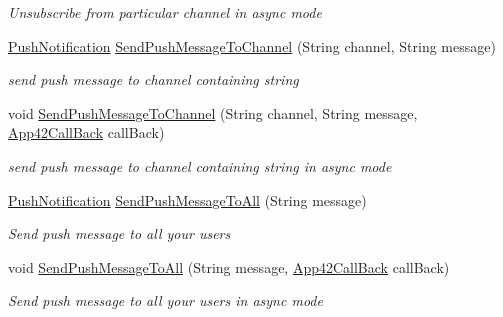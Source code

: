 \begin{DoxyCompactItemize}
\begin{DoxyCompactList}\small\item\em Unsubscribe from particular channel in async mode \end{DoxyCompactList}\item 
\hyperlink{classcom_1_1shephertz_1_1app42_1_1paas_1_1sdk_1_1csharp_1_1push_notification_1_1_push_notification}{Push\+Notification} \hyperlink{classcom_1_1shephertz_1_1app42_1_1paas_1_1sdk_1_1csharp_1_1push_notification_1_1_push_notification_service_af5676989bbb59ea1db8d457072159b58}{Send\+Push\+Message\+To\+Channel} (String channel, String message)
\begin{DoxyCompactList}\small\item\em send push message to channel containing string \end{DoxyCompactList}\item 
void \hyperlink{classcom_1_1shephertz_1_1app42_1_1paas_1_1sdk_1_1csharp_1_1push_notification_1_1_push_notification_service_a28ea0a4d4d3450dfecda9f8a8ef63fd1}{Send\+Push\+Message\+To\+Channel} (String channel, String message, \hyperlink{interfacecom_1_1shephertz_1_1app42_1_1paas_1_1sdk_1_1csharp_1_1_app42_call_back}{App42\+Call\+Back} call\+Back)
\begin{DoxyCompactList}\small\item\em send push message to channel containing string in async mode \end{DoxyCompactList}\item 
\hyperlink{classcom_1_1shephertz_1_1app42_1_1paas_1_1sdk_1_1csharp_1_1push_notification_1_1_push_notification}{Push\+Notification} \hyperlink{classcom_1_1shephertz_1_1app42_1_1paas_1_1sdk_1_1csharp_1_1push_notification_1_1_push_notification_service_a2b26755984381e9a9848da1ebdc0678e}{Send\+Push\+Message\+To\+All} (String message)
\begin{DoxyCompactList}\small\item\em Send push message to all your users \end{DoxyCompactList}\item 
void \hyperlink{classcom_1_1shephertz_1_1app42_1_1paas_1_1sdk_1_1csharp_1_1push_notification_1_1_push_notification_service_a11d85de074a615f0d4135e458f640b7d}{Send\+Push\+Message\+To\+All} (String message, \hyperlink{interfacecom_1_1shephertz_1_1app42_1_1paas_1_1sdk_1_1csharp_1_1_app42_call_back}{App42\+Call\+Back} call\+Back)
\begin{DoxyCompactList}\small\item\em Send push message to all your users in async mode \end{DoxyCompactList}\item 

\end{DoxyCompactItemize}
